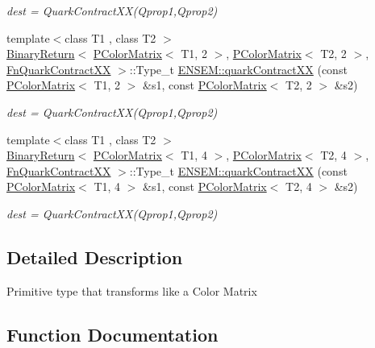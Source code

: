 \begin{DoxyCompactItemize}
\begin{DoxyCompactList}\small\item\em dest = Quark\+Contract\+X\+X(\+Qprop1,\+Qprop2) \end{DoxyCompactList}\item 
{\footnotesize template$<$class T1 , class T2 $>$ }\\\mbox{\hyperlink{structENSEM_1_1BinaryReturn}{Binary\+Return}}$<$ \mbox{\hyperlink{classENSEM_1_1PColorMatrix}{P\+Color\+Matrix}}$<$ T1, 2 $>$, \mbox{\hyperlink{classENSEM_1_1PColorMatrix}{P\+Color\+Matrix}}$<$ T2, 2 $>$, \mbox{\hyperlink{structENSEM_1_1FnQuarkContractXX}{Fn\+Quark\+Contract\+XX}} $>$\+::Type\+\_\+t \mbox{\hyperlink{group__primcolormatrix_gaeaaf0956a43ba474c9f772480094c1f5}{E\+N\+S\+E\+M\+::quark\+Contract\+XX}} (const \mbox{\hyperlink{classENSEM_1_1PColorMatrix}{P\+Color\+Matrix}}$<$ T1, 2 $>$ \&s1, const \mbox{\hyperlink{classENSEM_1_1PColorMatrix}{P\+Color\+Matrix}}$<$ T2, 2 $>$ \&s2)
\begin{DoxyCompactList}\small\item\em dest = Quark\+Contract\+X\+X(\+Qprop1,\+Qprop2) \end{DoxyCompactList}\item 
{\footnotesize template$<$class T1 , class T2 $>$ }\\\mbox{\hyperlink{structENSEM_1_1BinaryReturn}{Binary\+Return}}$<$ \mbox{\hyperlink{classENSEM_1_1PColorMatrix}{P\+Color\+Matrix}}$<$ T1, 4 $>$, \mbox{\hyperlink{classENSEM_1_1PColorMatrix}{P\+Color\+Matrix}}$<$ T2, 4 $>$, \mbox{\hyperlink{structENSEM_1_1FnQuarkContractXX}{Fn\+Quark\+Contract\+XX}} $>$\+::Type\+\_\+t \mbox{\hyperlink{group__primcolormatrix_ga8f56e6d4ff1d01fb47481eb16006efa7}{E\+N\+S\+E\+M\+::quark\+Contract\+XX}} (const \mbox{\hyperlink{classENSEM_1_1PColorMatrix}{P\+Color\+Matrix}}$<$ T1, 4 $>$ \&s1, const \mbox{\hyperlink{classENSEM_1_1PColorMatrix}{P\+Color\+Matrix}}$<$ T2, 4 $>$ \&s2)
\begin{DoxyCompactList}\small\item\em dest = Quark\+Contract\+X\+X(\+Qprop1,\+Qprop2) \end{DoxyCompactList}\end{DoxyCompactItemize}


\subsection{Detailed Description}
Primitive type that transforms like a Color Matrix 

\subsection{Function Documentation}
\mbox{\label{group__primcolormatrix_ga200705dac956b2d421ea1793fdb916b9}} 
